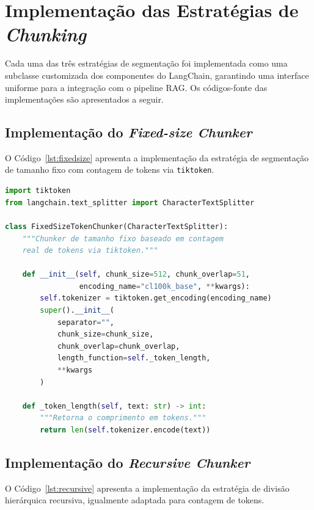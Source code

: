 \documentclass[
	12pt,				%
	openright,			%
	oneside,			%
	a4paper,			%
	tccpreliminar,		%
	]{ABNT-DC-UEL}
\begin{document}
\section{Implementação das Estratégias de \textit{Chunking}}

Cada uma das três estratégias de segmentação foi implementada como uma subclasse customizada dos componentes do LangChain, garantindo uma interface uniforme para a integração com o pipeline RAG. Os códigos-fonte das implementações são apresentados a seguir.

\subsection{Implementação do \textit{Fixed-size Chunker}}

O Código~\ref{lst:fixedsize} apresenta a implementação da estratégia de segmentação de tamanho fixo com contagem de tokens via \texttt{tiktoken}.

\begin{lstlisting}[language=Python, caption={Implementação do \textit{Fixed-size Chunker} com contagem de tokens via \texttt{tiktoken}.}, label=lst:fixedsize]
import tiktoken
from langchain.text_splitter import CharacterTextSplitter

class FixedSizeTokenChunker(CharacterTextSplitter):
    """Chunker de tamanho fixo baseado em contagem 
    real de tokens via tiktoken."""
    
    def __init__(self, chunk_size=512, chunk_overlap=51,
                 encoding_name="cl100k_base", **kwargs):
        self.tokenizer = tiktoken.get_encoding(encoding_name)
        super().__init__(
            separator="",
            chunk_size=chunk_size,
            chunk_overlap=chunk_overlap,
            length_function=self._token_length,
            **kwargs
        )

    def _token_length(self, text: str) -> int:
        """Retorna o comprimento em tokens."""
        return len(self.tokenizer.encode(text))
\end{lstlisting}

\subsection{Implementação do \textit{Recursive Chunker}}

O Código~\ref{lst:recursive} apresenta a implementação da estratégia de divisão hierárquica recursiva, igualmente adaptada para contagem de tokens.
\end{document}
